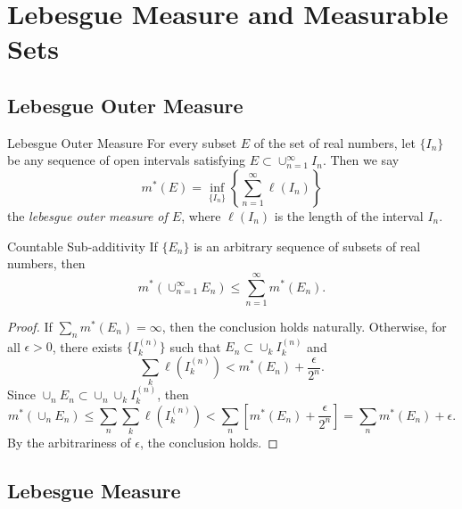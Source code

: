 
\section{Lebesgue Measure and Measurable Sets}

\subsection{Lebesgue Outer Measure}

\begin{definition}{Lebesgue Outer Measure}{}
  For every subset $E$ of the set of real numbers,
  let $\{I_n\}$ be any sequence of open intervals satisfying
  $E \subset \cup _{n = 1}^{\infty} I_n$. Then we say
  \begin{equation}
    m^{\ast} (E) = \inf_{\{I_n\}} \left\{\sum_{n = 1}^{\infty} \ell(I_n)\right\}
  \end{equation}
  the \emph{lebesgue outer measure of $E$},
  where $\ell(I_n)$ is the length of the interval $I_n$.
\end{definition}

\begin{proposition}{Countable Sub-additivity}{}
  If $\{E_n\}$ is an arbitrary sequence of subsets of real numbers,
  then
  \begin{equation}
    m^{\ast} (\cup _{n = 1}^{\infty} E_n) \leq \sum _{n = 1}^{\infty} m^{\ast}(E_n).
  \end{equation}
\end{proposition}

\begin{proof}
  If $\sum_n m^{\ast}(E_n) = \infty$, then the conclusion holds naturally.
  Otherwise, for all $\epsilon > 0$, there exists $\{I_k^{(n)}\}$ such that
  $E_n \subset \cup_k I_k^{(n)}$ and
  \begin{equation}
    \sum \limits _k \ell(I_k^{(n)}) < m^{\ast}(E_n) + \frac{\epsilon}{2^n}.
  \end{equation}
  Since $\cup _n E_n \subset \cup _n \cup _k I_k^{(n)}$, then
  \begin{equation}
    m^{\ast}(\cup _n E_n)
    \leq \sum _n \sum _k \ell(I_k^{(n)})
    < \sum _n \left[ m^{\ast}(E_n) + \frac{\epsilon}{2^n} \right]
    = \sum _n m^{\ast}(E_n) + \epsilon.
  \end{equation}
  By the arbitrariness of $\epsilon$, the conclusion holds.
\end{proof}


\subsection{Lebesgue Measure}

